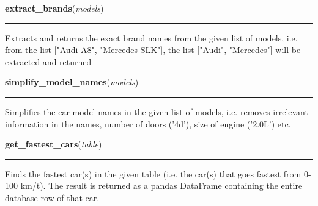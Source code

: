     \vspace{0.5ex}

\hspace{.8\funcindent}\begin{boxedminipage}{\funcwidth}

    \raggedright \textbf{extract\_brands}(\textit{models})

    \vspace{-1.5ex}

    \rule{\textwidth}{0.5\fboxrule}
\setlength{\parskip}{2ex}
    Extracts and returns the exact brand names from the given list of 
    models, i.e. from the list ["Audi A8", "Mercedes SLK"], the list 
    ["Audi", "Mercedes"] will be extracted and returned

\setlength{\parskip}{1ex}
    \end{boxedminipage}

    \label{BilbasenDataMining:datamining:simplify_model_names}

    \vspace{0.5ex}

\hspace{.8\funcindent}\begin{boxedminipage}{\funcwidth}

    \raggedright \textbf{simplify\_model\_names}(\textit{models})

    \vspace{-1.5ex}

    \rule{\textwidth}{0.5\fboxrule}
\setlength{\parskip}{2ex}
    Simplifies the car model names in the given list of models, i.e. 
    removes irrelevant information in the names, number of doors ('4d'), 
    size of engine ('2.0L') etc.

\setlength{\parskip}{1ex}
    \end{boxedminipage}

    \label{BilbasenDataMining:datamining:get_fastest_cars}

    \vspace{0.5ex}

\hspace{.8\funcindent}\begin{boxedminipage}{\funcwidth}

    \raggedright \textbf{get\_fastest\_cars}(\textit{table})

    \vspace{-1.5ex}

    \rule{\textwidth}{0.5\fboxrule}
\setlength{\parskip}{2ex}
    Finds the fastest car(s) in the given table (i.e. the car(s) that goes 
    fastest from 0-100 km/t). The result is returned as a pandas DataFrame 
    containing the entire database row of that car.

\setlength{\parskip}{1ex}
    \end{boxedminipage}

